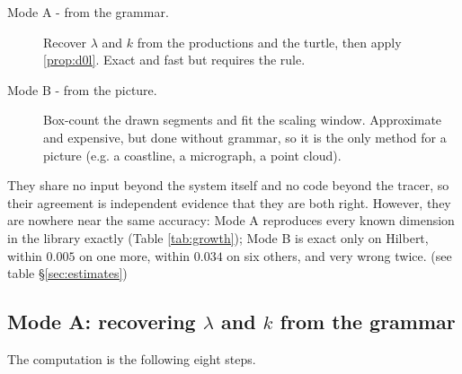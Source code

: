 \documentclass[11pt, a4paper]{article}
\theoremstyle{plain}
\theoremstyle{definition}
\theoremstyle{remark}
\begin{document}
\begin{description}
    \item[Mode A - from the grammar.] Recover $\lambda$ and $k$ from the
    productions and the turtle, then apply \ref{prop:d0l}. Exact and fast but requires the rule.
    \item[Mode B - from the picture.] Box-count the drawn segments and fit
    the scaling window. Approximate and expensive, but done without grammar, so it is the only method for a
    picture (e.g. a coastline, a micrograph, a point cloud).
\end{description}

\noindent They share no input beyond the system itself and no code beyond the
tracer, so their agreement is independent evidence that they are both right. However, they are nowhere near the same accuracy:
Mode A reproduces every known dimension in the library exactly (Table \ref{tab:growth}); 
Mode B is exact only on Hilbert, within $0.005$ on one more, within $0.034$ on six others, and very wrong twice. (see table \S\ref{sec:estimates})

\subsection{Mode A: recovering \texorpdfstring{$\lambda$}{lambda} and
\texorpdfstring{$k$}{k} from the grammar}
\label{sec:modea}

The computation is the following eight steps.
\end{document}
